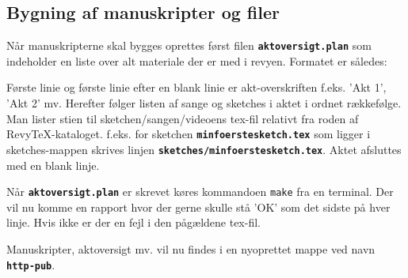 \documentclass{article}
\newcommand{\fname}[1]{\textbf{\texttt{#1}}}
\newcommand{\shellcmd}[1]{\texttt{#1}}
\begin{document}
\subsection{Bygning af manuskripter og filer}
Når manuskripterne skal bygges oprettes først filen
\fname{aktoversigt.plan}
som indeholder en liste over alt materiale der er med i revyen. Formatet
er således:

Første linie og første linie efter en blank linie er akt-overskriften
f.eks. 'Akt 1', 'Akt 2' mv. Herefter følger listen af sange og sketches
i aktet i ordnet rækkefølge. Man lister stien til
sketchen/sangen/videoens tex-fil relativt fra roden af
RevyTeX-kataloget. f.eks. for sketchen \fname{minfoerstesketch.tex} som ligger
i sketches-mappen skrives linjen \fname{sketches/minfoerstesketch.tex}. Aktet
afsluttes med en blank linje.

Når \fname{aktoversigt.plan} er skrevet køres kommandoen \shellcmd{make} fra en terminal.
Der vil nu komme en rapport hvor der gerne skulle stå 'OK' som det
sidste på hver linje. Hvis ikke er der en fejl i den pågældene tex-fil.

Manuskripter, aktoversigt mv. vil nu findes i en nyoprettet mappe ved
navn \fname{http-pub}.
\end{document}
